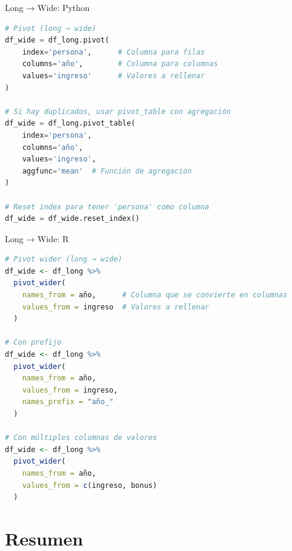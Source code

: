 \documentclass[aspectratio=169]{beamer}
\begin{document}
\begin{frame}[fragile]{Long → Wide: Python}
\begin{lstlisting}[language=Python]
# Pivot (long → wide)
df_wide = df_long.pivot(
    index='persona',      # Columna para filas
    columns='año',        # Columna para columnas
    values='ingreso'      # Valores a rellenar
)

# Si hay duplicados, usar pivot_table con agregación
df_wide = df_long.pivot_table(
    index='persona',
    columns='año',
    values='ingreso',
    aggfunc='mean'  # Función de agregación
)

# Reset index para tener 'persona' como columna
df_wide = df_wide.reset_index()
\end{lstlisting}
\end{frame}

\begin{frame}[fragile]{Long → Wide: R}
\begin{lstlisting}[language=R]
# Pivot wider (long → wide)
df_wide <- df_long %>%
  pivot_wider(
    names_from = año,      # Columna que se convierte en columnas
    values_from = ingreso  # Valores a rellenar
  )

# Con prefijo
df_wide <- df_long %>%
  pivot_wider(
    names_from = año,
    values_from = ingreso,
    names_prefix = "año_"
  )

# Con múltiples columnas de valores
df_wide <- df_long %>%
  pivot_wider(
    names_from = año,
    values_from = c(ingreso, bonus)
  )
\end{lstlisting}
\end{frame}

\section{Resumen}
\end{document}
